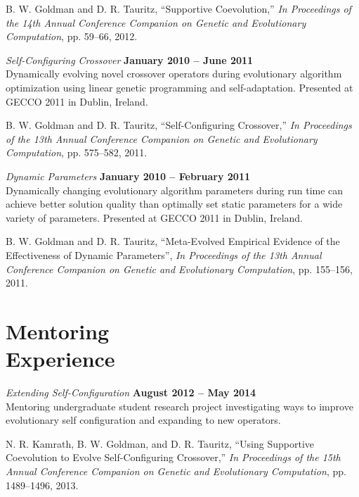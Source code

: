 \documentclass[margin,line]{resume}
\begin{document}
\begin{resume}
    \vspace{-2mm}
    B. W. Goldman and D. R. Tauritz,
    ``Supportive Coevolution,''
    \textsl{In Proceedings of the 14th Annual Conference Companion on Genetic and Evolutionary Computation}, pp. 59--66, 2012.

    \textsl{Self-Configuring Crossover} \hfill \textbf{January 2010 -- June 2011}\\
    Dynamically evolving novel crossover operators during evolutionary algorithm optimization 
    using linear genetic programming and self-adaptation.  Presented at GECCO 2011 in Dublin, Ireland.
    
    \vspace{-2mm}
    B. W. Goldman and D. R. Tauritz,
    ``Self-Configuring Crossover,''
    \textsl{In Proceedings of the 13th Annual Conference Companion on Genetic and Evolutionary Computation}, pp. 575--582, 2011.

    \textsl{Dynamic Parameters} \hfill \textbf{January 2010 -- February 2011}\\
    Dynamically changing evolutionary algorithm parameters during run time can achieve better solution quality
    than optimally set static parameters for a wide variety of parameters.
    Presented at GECCO 2011 in Dublin, Ireland.

    \vspace{-2mm}    
    B. W. Goldman and D. R. Tauritz,
    ``Meta-Evolved Empirical Evidence of the Effectiveness of Dynamic Parameters'',
    \textsl{In Proceedings of the 13th Annual Conference Companion on Genetic and Evolutionary Computation}, pp. 155--156, 2011.
    
    \section{\mysidestyle Mentoring\\Experience}

    \textsl{Extending Self-Configuration} \hfill \textbf{August 2012 -- May 2014}\\
    Mentoring undergraduate student research project investigating ways to improve evolutionary
    self configuration and expanding to new operators.
    
    \vspace{-2mm}
    N. R. Kamrath, B. W. Goldman, and D. R. Tauritz,
    ``Using Supportive Coevolution to Evolve Self-Configuring Crossover,''
    \textsl{In Proceedings of the 15th Annual Conference Companion on Genetic and Evolutionary Computation}, pp. 1489--1496, 2013.


\end{resume}
\end{document}
